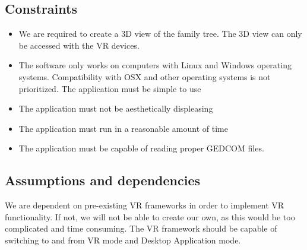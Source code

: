 \documentclass[onecolumn, draftclsnofoot, 10pt, compsoc]{IEEEtran}
\begin{document}
\subsection{Constraints}
\begin{itemize}
\item We are required to create a 3D view of the family tree. The 3D view can only be accessed with the VR devices. 
\item The software only works on computers with Linux and Windows operating systems. Compatibility with OSX and other operating systems is not prioritized. The application must be simple to use
\item The application must not be aesthetically displeasing
\item The application must run in a reasonable amount of time
\item The application must be capable of reading proper GEDCOM files.
\end{itemize}

\subsection{Assumptions and dependencies}
\begin{singlespace}
We are dependent on pre-existing VR frameworks in order to implement VR functionality. If not, we will not be able to create our own, as this would be too complicated and time consuming. The VR framework should be capable of switching to and from VR mode and Desktop Application mode.
\end{singlespace}
\end{document}
